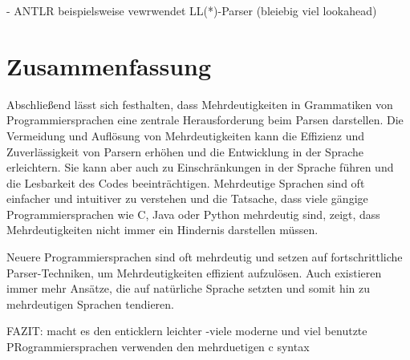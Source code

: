 \documentclass[runningheads]{llncs}
\begin{document}
	- ANTLR beispielsweise vewrwendet LL(*)-Parser (bleiebig viel lookahead)


	\section{Zusammenfassung}\label{sec:zusammenfassung}

	Abschließend lässt sich festhalten, dass Mehrdeutigkeiten in Grammatiken von Programmiersprachen
	eine zentrale Herausforderung beim Parsen darstellen.
	Die Vermeidung und Auflösung von Mehrdeutigkeiten kann die Effizienz und Zuverlässigkeit von Parsern erhöhen
	und die Entwicklung in der Sprache erleichtern.
	Sie kann aber auch zu Einschränkungen in der Sprache führen und die Lesbarkeit des Codes beeinträchtigen.
	Mehrdeutige Sprachen sind oft einfacher und intuitiver zu verstehen
	und die Tatsache, dass viele gängige Programmiersprachen wie C, Java oder Python mehrdeutig sind,
	zeigt, dass Mehrdeutigkeiten nicht immer ein Hindernis darstellen müssen.

	Neuere Programmiersprachen sind oft mehrdeutig und setzen auf fortschrittliche Parser-Techniken,
	um Mehrdeutigkeiten effizient aufzulösen.
	Auch existieren immer mehr Ansätze, die auf natürliche Sprache setzten
	und somit hin zu mehrdeutigen Sprachen tendieren.

	FAZIT: macht es den enticklern leichter
	-viele moderne und viel benutzte PRogrammiersprachen verwenden den mehrduetigen c syntax


%
%
%


	\nocite{*}
	
	
\end{document}
